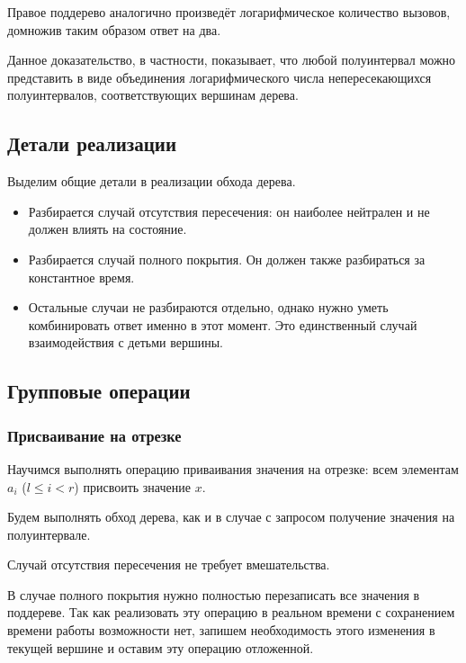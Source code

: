 \documentclass[a4paper,12pt]{article}
\begin{document}
    Правое поддерево аналогично произведёт логарифмическое
    количество вызовов, домножив таким образом ответ на два.

    Данное доказательство, в частности, показывает, что любой
    полуинтервал можно представить в виде объединения логарифмического
    числа непересекающихся полуинтервалов, соответствующих
    вершинам дерева.

    \subsection{Детали реализации}

    Выделим общие детали в реализации обхода дерева.
    \begin{itemize}
      \item Разбирается случай отсутствия пересечения: он наиболее
        нейтрален и не должен влиять на состояние.
      \item Разбирается случай полного покрытия. Он должен также
        разбираться за константное время.
      \item Остальные случаи не разбираются отдельно, однако
        нужно уметь комбинировать ответ именно в этот момент.
        Это единственный случай взаимодействия с детьми вершины.
    \end{itemize}

    \subsection{Групповые операции}

      \subsubsection{Присваивание на отрезке}

      Научимся выполнять операцию приваивания значения на отрезке:
      всем элементам $a_i$ ($l \le i < r$) присвоить значение $x$.

      Будем выполнять обход дерева, как и в случае с запросом
      получение значения на полуинтервале.

      Случай отсутствия пересечения не требует вмешательства.

      В случае полного покрытия нужно полностью перезаписать все
      значения в поддереве. Так как реализовать эту операцию
      в реальном времени с сохранением времени работы возможности
      нет, запишем необходимость этого изменения в текущей вершине
      и оставим эту операцию отложенной.
\end{document}

